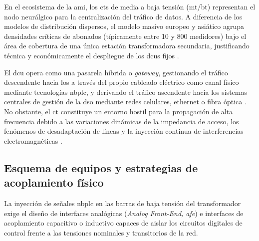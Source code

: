 En el ecosistema de la \gls{ami}, los \glspl{ct} de media a baja tensión (\gls{mt}/\gls{bt}) representan el nodo neurálgico para la centralización del tráfico de datos. A diferencia de los modelos de distribución dispersos, el modelo masivo europeo y asiático agrupa densidades críticas de abonados (típicamente entre 10 y 800 medidores) bajo el área de cobertura de una única estación transformadora secundaria, justificando técnica y económicamente el despliegue de los \glspl{dcu} fijos \cite{6925952}.

El \gls{dcu} opera como una pasarela híbrida o \textit{gateway}, gestionando el tráfico descendente hacia los  a través del propio cableado eléctrico como canal físico mediante tecnologías \gls{nbplc}, y derivando el tráfico ascendente hacia los sistemas centrales de gestión de la \gls{dso} mediante redes celulares, ethernet o fibra óptica \cite{SHARMA2017704, 10843716}. No obstante, el \gls{ct} constituye un entorno hostil para la propagación de alta frecuencia debido a las variaciones dinámicas de la impedancia de acceso, los fenómenos de desadaptación de líneas y la inyección continua de interferencias electromagnéticas \cite{9115397, 9881962}.

\subsection{Esquema de equipos y estrategias de acoplamiento físico}
\label{subsec:acoplamiento_PLC}

La inyección de señales \gls{nbplc} en las barras de baja tensión del transformador exige el diseño de interfaces analógicas (\textit{Analog Front-End, \gls{afe}}) e interfaces de acoplamiento capacitivo o inductivo capaces de aislar los circuitos digitales de control frente a las tensiones nominales y transitorios de la red. 

